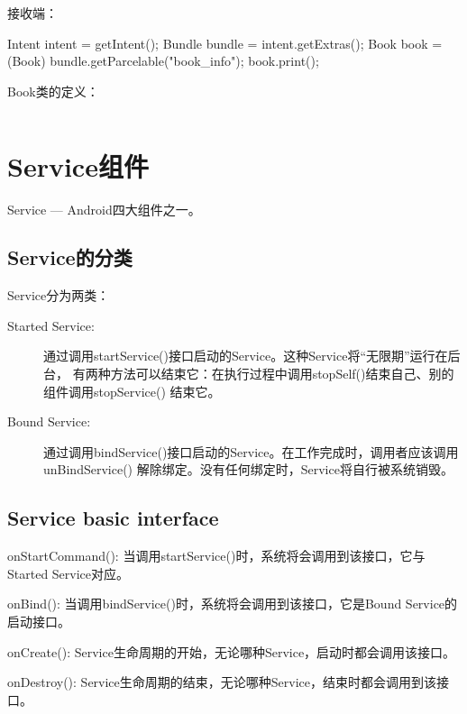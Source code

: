 ﻿\documentclass[a4paper,11pt]{article}
\begin{document}
  接收端：\par
  \begin{javacode}
Intent intent = getIntent();
Bundle bundle = intent.getExtras();
Book book = (Book) bundle.getParcelable("book_info");
book.print();
  \end{javacode}

  Book类的定义：\par
  \inputminted[linenos,tabsize=4,bgcolor=srcbg]{java}{srcdir/ParcableBook.java}


  \section[Service组件]{Service组件}
  Service --- Android四大组件之一。

  \subsection[Service的分类]{Service的分类}
  Service分为两类：\par
  \begin{description}
    \item[Started Service:] 通过调用startService()接口启动的Service。这种Service将“无限期”运行在后台，
                            有两种方法可以结束它：在执行过程中调用stopSelf()结束自己、别的组件调用stopService() 结束它。
    \item[Bound Service:] 通过调用bindService()接口启动的Service。在工作完成时，调用者应该调用unBindService()
                          解除绑定。没有任何绑定时，Service将自行被系统销毁。
  \end{description}

  \subsection[Service basic interface]{Service basic interface}
  \begin{coloredenumerate}
    \item onStartCommand(): 当调用startService()时，系统将会调用到该接口，它与Started Service对应。
    \item onBind(): 当调用bindService()时，系统将会调用到该接口，它是Bound Service的启动接口。
    \item onCreate(): Service生命周期的开始，无论哪种Service，启动时都会调用该接口。
    \item onDestroy(): Service生命周期的结束，无论哪种Service，结束时都会调用到该接口。
  \end{coloredenumerate}
\end{document}
